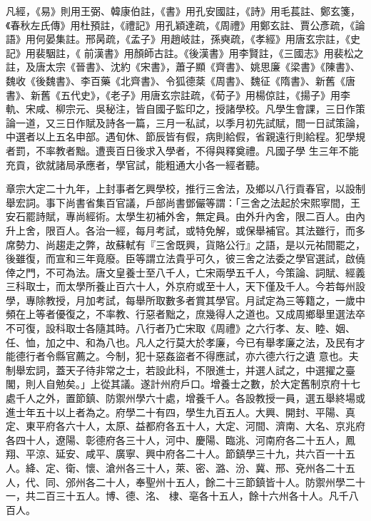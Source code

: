 \begin{pinyinscope}
 凡經，《易》則用王弼、韓康伯註，《書》用孔安國註，《詩》用毛萇註、鄭玄箋，《春秋左氏傳》用杜預註，《禮記》用孔穎達疏，《周禮》用鄭玄註、賈公彥疏，《論語》用何晏集註。邢昺疏，《孟子》用趙岐註，孫奭疏，《孝經》用唐玄宗註，《史記》用裴駰註，《
 前漢書》用顏師古註。《後漢書》用李賢註，《三國志》用裴松之註，及唐太宗《晉書》、沈約《宋書》，蕭子顯《齊書》、姚思廉《梁書》《陳書》、魏收《後魏書》、李百藥《北齊書》、令狐德棻《周書》、魏征《隋書》、新舊《唐書》、新舊《五代史》，《老子》用唐玄宗註疏，《荀子》用楊倞註，《揚子》用李軌、宋咸、柳宗元、吳秘注，皆自國子監印之，授諸學校。凡學生會課，三日作策論一道，又三日作賦及詩各一篇，三月一私試，以季月初先試賦，間一日試策論，中選者以上五名申部。遇旬休、節辰皆有假，病則給假，省親遠行則給程。犯學規者罰，不率教者黜。遭喪百日後求入學者，不得與釋奠禮。凡國子學
 生三年不能充貢，欲就諸局承應者，學官試，能粗通大小各一經者聽。



 章宗大定二十九年，上封事者乞興學校，推行三舍法，及鄉以八行貢春官，以設制舉宏詞。事下尚書省集百官議，戶部尚書鄧儼等謂：「三舍之法起於宋熙寧間，王安石罷詩賦，專尚經術。太學生初補外舍，無定員。由外升內舍，限二百人。由內升上舍，限百人。各治一經，每月考試，或特免解，或保舉補官。其法雖行，而多席勢力、尚趨走之弊，故蘇軾有『三舍既興，貨賂公行』之語，是以元祐間罷之，後雖復，而宣和三年竟廢。臣等謂立法貴乎可久，彼三舍之法委之學官選試，啟僥
 倖之門，不可為法。唐文皇養士至八千人，亡宋兩學五千人，今策論、詞賦、經義三科取士，而太學所養止百六十人，外京府或至十人，天下僅及千人。今若每州設學，專除教授，月加考試，每舉所取數多者賞其學官。月試定為三等籍之，一歲中頻在上等者優復之，不率教、行惡者黜之，庶幾得人之道也。又成周鄉舉里選法卒不可復，設科取士各隨其時。八行者乃亡宋取《周禮》之六行孝、友、睦、姻、任、恤，加之中、和為八也。凡人之行莫大於孝廉，今已有舉孝廉之法，及民有才能德行者令縣官薦之。今制，犯十惡姦盜者不得應試，亦六德六行之遺
 意也。夫制舉宏詞，蓋天子待非常之士，若設此科，不限進士，并選人試之，中選擢之臺閣，則人自勉矣。」上從其議。遂計州府戶口。增養士之數，於大定舊制京府十七處千人之外，置節鎮、防禦州學六十處，增養千人。各設教授一員，選五舉終場或進士年五十以上者為之。府學二十有四，學生九百五人。大興、開封、平陽、真定、東平府各六十人，太原、益都府各五十人，大定、河間、濟南、大名、京兆府各四十人，遼陽、彰德府各三十人，河中、慶陽、臨洮、河南府各二十五人，鳳翔、平涼、延安、咸平、廣寧、興中府各二十人。節鎮學三十九，共六百一十五人。絳、定、衛、懷、滄州各三十人，萊、密、潞、汾、冀、邢、兗州各二十五人，代、同、邠州各二十人，奉聖州十五人，餘二十三節鎮皆十人。防禦州學二十一，共二百三十五人。博、德、洺、
 棣、亳各十五人，餘十六州各十人。凡千八百人。




\end{pinyinscope}
